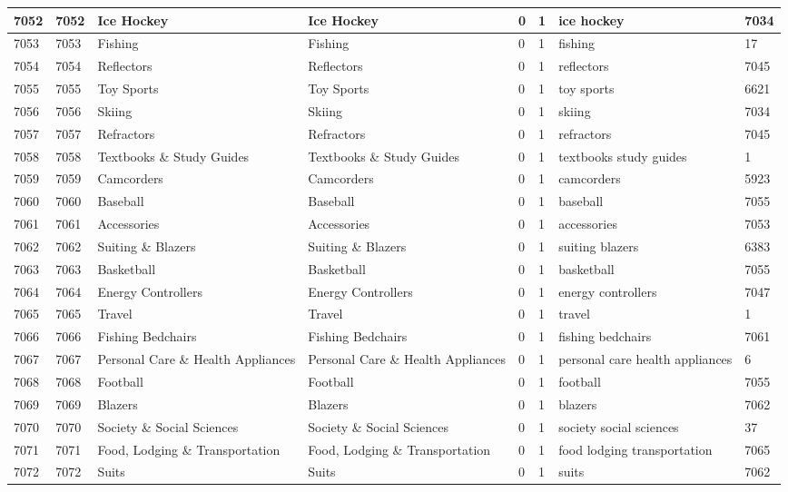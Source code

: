 \begin{longtable}{|l|l|l|l|l|l|l|l|}
7052 & 7052 & Ice Hockey & Ice Hockey & 0 & 1 & ice hockey & 7034 \\ \hline 
7053 & 7053 & Fishing & Fishing & 0 & 1 & fishing & 17 \\ \hline 
7054 & 7054 & Reflectors & Reflectors & 0 & 1 & reflectors & 7045 \\ \hline 
7055 & 7055 & Toy Sports & Toy Sports & 0 & 1 & toy sports & 6621 \\ \hline 
7056 & 7056 & Skiing & Skiing & 0 & 1 & skiing & 7034 \\ \hline 
7057 & 7057 & Refractors & Refractors & 0 & 1 & refractors & 7045 \\ \hline 
7058 & 7058 & Textbooks \& Study Guides & Textbooks \& Study Guides & 0 & 1 & textbooks study guides & 1 \\ \hline 
7059 & 7059 & Camcorders & Camcorders & 0 & 1 & camcorders & 5923 \\ \hline 
7060 & 7060 & Baseball & Baseball & 0 & 1 & baseball & 7055 \\ \hline 
7061 & 7061 & Accessories & Accessories & 0 & 1 & accessories & 7053 \\ \hline 
7062 & 7062 & Suiting \& Blazers & Suiting \& Blazers & 0 & 1 & suiting blazers & 6383 \\ \hline 
7063 & 7063 & Basketball & Basketball & 0 & 1 & basketball & 7055 \\ \hline 
7064 & 7064 & Energy Controllers & Energy Controllers & 0 & 1 & energy controllers & 7047 \\ \hline 
7065 & 7065 & Travel & Travel & 0 & 1 & travel & 1 \\ \hline 
7066 & 7066 & Fishing Bedchairs & Fishing Bedchairs & 0 & 1 & fishing bedchairs & 7061 \\ \hline 
7067 & 7067 & Personal Care \& Health Appliances & Personal Care \& Health Appliances & 0 & 1 & personal care health appliances & 6 \\ \hline 
7068 & 7068 & Football & Football & 0 & 1 & football & 7055 \\ \hline 
7069 & 7069 & Blazers & Blazers & 0 & 1 & blazers & 7062 \\ \hline 
7070 & 7070 & Society \& Social Sciences & Society \& Social Sciences & 0 & 1 & society social sciences & 37 \\ \hline 
7071 & 7071 & Food, Lodging \& Transportation & Food, Lodging \& Transportation & 0 & 1 & food lodging transportation & 7065 \\ \hline 
7072 & 7072 & Suits & Suits & 0 & 1 & suits & 7062 \\ \hline 

\end{longtable}
